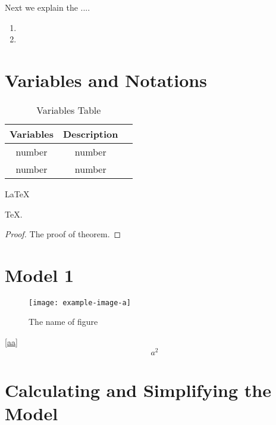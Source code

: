 \documentclass{mcmthesis}
\numberwithin{equation}{section}
\numberwithin{figure}{section}
\numberwithin{table}{section}
\begin{document}
Next we explain the ....
\begin{enumerate}
	\item 
	\item 
\end{enumerate}


\section{Variables and Notations}

\begin{table}
	\centering
	\begin{tabular}{ccc}
		\toprule
		Variables & Description  \\
		\midrule
		number & number \\
		number & number  \\
		\bottomrule	
	\end{tabular}
	\caption{Variables Table}
    \label{tab:1}       %
\end{table}



\begin{Theorem} \label{thm:latex}
\LaTeX
\end{Theorem}
\begin{Lemma} \label{thm:tex}
\TeX .
\end{Lemma}
\begin{proof}
The proof of theorem.
\end{proof}




\section{Model 1}

\begin{figure}[h]
\centering
\texttt{[image: example-image-a]}
\caption{The name of figure} \label{fig:aa}
\end{figure}

\lipsum[8] \eqref{aa}
\begin{equation}
a^2 \label{aa}
\end{equation}



\section{Calculating and Simplifying the Model  }
\lipsum[11]
\end{document}
